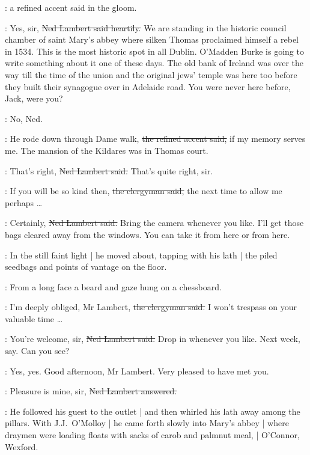 :
a refined accent said in the gloom.

\lambert:
Yes, sir,
\sout{Ned Lambert said heartily.}
We are standing in the historic council chamber of saint Mary's abbey
where silken Thomas proclaimed himself a rebel in 1534.
This is the most historic spot in all Dublin.
O'Madden Burke is going to write something about it
one of these days.
The old bank of Ireland was over the way
till the time of the union
and the original jews' temple was here too
before they built their synagogue over in Adelaide road.
You were never here before, Jack,
were you?

\jjom:
No, Ned.

\revlove:
He rode down through Dame walk,
\sout{the refined accent said,}
if my memory serves me.
The mansion of the Kildares was in Thomas court.

\lambert:
That's right,
\sout{Ned Lambert said.}
That's quite right, sir.

\revlove:
If you will be so kind then,
\sout{the clergyman said,}
the next time to allow
me perhaps \ldots

\lambert:
Certainly,
\sout{Ned Lambert said.}
Bring the camera whenever you like.
I'll get those bags cleared away from the windows.
You can take it from here or from here.

:
In the still faint light |
he moved about,
tapping with his lath |
the piled seedbags and points of vantage on the floor.

\begin{interject}
    :
    From a long face
    a beard and gaze hung on a chessboard.
\end{interject}

\revlove:
I'm deeply obliged, Mr Lambert,
\sout{the clergyman said.}
I won't trespass on your valuable time \ldots

\lambert:
You're welcome, sir,
\sout{Ned Lambert said.}
Drop in whenever you like.
Next week, say.
Can you see?

\revlove:
Yes, yes.
Good afternoon, Mr Lambert.
Very pleased to have met you.

\lambert:
Pleasure is mine, sir,
\sout{Ned Lambert answered.}

:
He followed his guest to the outlet |
and then whirled his lath away among the pillars.
With J.J.~O'Molloy |
he came forth slowly into Mary's abbey |
where draymen were loading floats
with sacks of carob and palmnut meal, |
O'Connor, Wexford.

